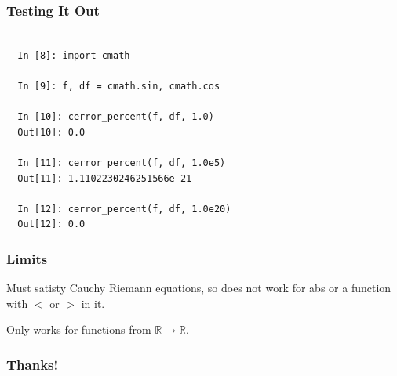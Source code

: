 \documentclass{beamer}
\def\R{\mathbb{R}}                     %
\begin{document}
\begin{frame}[fragile]
\frametitle{Testing It Out}

\begin{lstlisting}

  In [8]: import cmath

  In [9]: f, df = cmath.sin, cmath.cos

  In [10]: cerror_percent(f, df, 1.0)
  Out[10]: 0.0

  In [11]: cerror_percent(f, df, 1.0e5)
  Out[11]: 1.1102230246251566e-21

  In [12]: cerror_percent(f, df, 1.0e20)
  Out[12]: 0.0\end{lstlisting}

\end{frame}

\begin{frame}
\frametitle{Limits}

Must satisty Cauchy Riemann equations, so does not work for abs or a function with $<$ or $>$ in it.

Only works for functions from $\R \to \R$.


\end{frame}

\begin{frame}

\frametitle{Thanks!}

\end{frame}
\end{document}
